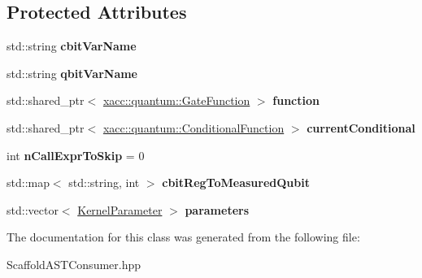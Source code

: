 \subsection*{Protected Attributes}
\begin{DoxyCompactItemize}
\item 
\mbox{\label{a01232_a98ef6d976c6cd91e260a007cbcb6e144}} 
std\+::string {\bfseries cbit\+Var\+Name}
\item 
\mbox{\label{a01232_a460cb6b66543f4992290b6c660cded01}} 
std\+::string {\bfseries qbit\+Var\+Name}
\item 
\mbox{\label{a01232_ace1ed18d3d08ad8ebb203dfe0022aed1}} 
std\+::shared\+\_\+ptr$<$ \hyperlink{a01272}{xacc\+::quantum\+::\+Gate\+Function} $>$ {\bfseries function}
\item 
\mbox{\label{a01232_ad71adbc4b269b38f714e6bf9be1b773e}} 
std\+::shared\+\_\+ptr$<$ \hyperlink{a01304}{xacc\+::quantum\+::\+Conditional\+Function} $>$ {\bfseries current\+Conditional}
\item 
\mbox{\label{a01232_a967b4790cda7cc44f99acc01310e5ef1}} 
int {\bfseries n\+Call\+Expr\+To\+Skip} = 0
\item 
\mbox{\label{a01232_a5d8b7ce3a8208dd0be810bd1832d7648}} 
std\+::map$<$ std\+::string, int $>$ {\bfseries cbit\+Reg\+To\+Measured\+Qubit}
\item 
\mbox{\label{a01232_ab17e34f8ea118332be0b2bca86c9474d}} 
std\+::vector$<$ \hyperlink{a01228}{Kernel\+Parameter} $>$ {\bfseries parameters}
\end{DoxyCompactItemize}


The documentation for this class was generated from the following file\+:\begin{DoxyCompactItemize}
\item 
Scaffold\+A\+S\+T\+Consumer.\+hpp\end{DoxyCompactItemize}
